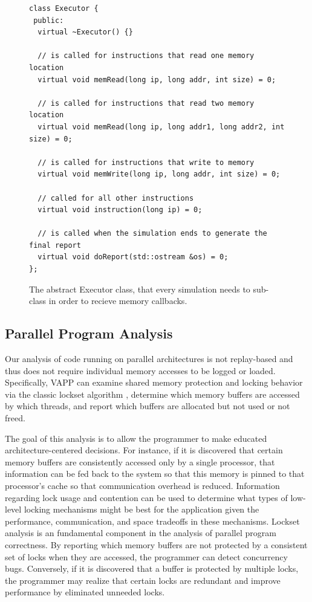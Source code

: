 \begin{figure}
  \lstset{
    language=C++,
    basicstyle=\small,
  }
  \begin{lstlisting}
class Executor {
 public:
  virtual ~Executor() {}

  // is called for instructions that read one memory location
  virtual void memRead(long ip, long addr, int size) = 0;

  // is called for instructions that read two memory location
  virtual void memRead(long ip, long addr1, long addr2, int size) = 0;

  // is called for instructions that write to memory
  virtual void memWrite(long ip, long addr, int size) = 0;

  // called for all other instructions
  virtual void instruction(long ip) = 0;

  // is called when the simulation ends to generate the final report
  virtual void doReport(std::ostream &os) = 0;
};
  \end{lstlisting}
  \caption{The abstract Executor class, that every simulation needs to
    sub-class in order to recieve memory callbacks.}
  \label{fig:executor}
\end{figure}

\subsection{Parallel Program Analysis}
\label{sec:ppa}
Our analysis of code running on parallel architectures is
not replay-based and thus does not require individual memory
accesses to be logged or loaded.  Specifically, VAPP can
examine shared memory protection and locking behavior via
the classic lockset algorithm \cite{savage1997eraser},
determine which memory buffers are accessed by which threads,
and report which buffers are allocated but not used or not freed.

The goal of this analysis is to allow the programmer to make
educated architecture-centered decisions.  For instance, if
it is discovered that certain memory buffers are consistently
accessed only by a single processor, that information can be
fed back to the system so that this memory is pinned to that
processor's cache so that communication overhead is reduced.
Information regarding lock usage and contention can be
used to determine what types of low-level locking mechanisms
might be best for the application given the performance, 
communication, and space tradeoffs in these mechanisms.
Lockset analysis is an fundamental component in the analysis
of parallel program correctness. By reporting which
memory buffers are not protected by a consistent set of locks
when they are accessed, the programmer can detect concurrency
bugs. Conversely, if it is discovered that a buffer is
protected by multiple locks, the programmer may realize that
certain locks are redundant and improve performance by eliminated
unneeded locks.

